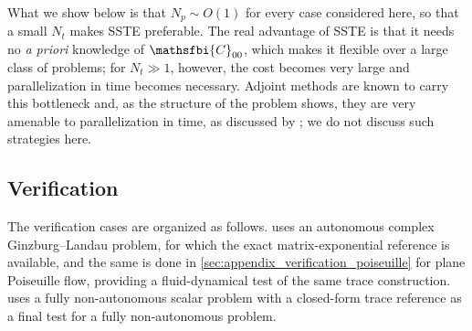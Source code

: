 What we show below is that \(N_p\sim O(1)\) for every case considered here, so that a small
\(N_t\) makes SSTE preferable. The real advantage of SSTE is that it needs no \emph{a priori}
knowledge of \(\mathsfbi{C}_{00}\), which makes it flexible over a large class of problems;
for \(N_t\gg1\), however, the cost becomes very large and parallelization in time becomes
necessary. Adjoint methods are known to carry this bottleneck and, as the structure of the problem
shows, they are very amenable to parallelization in time, as discussed by
\citet{skene-eggl-schmid-2021}; we do not discuss such strategies here.
\subsection{Verification}
\label{sec:appendix_verification}
The verification cases are organized as follows.  uses an autonomous complex Ginzburg--Landau problem, for which the exact matrix-exponential reference is available, and the same is done in \cref{sec:appendix_verification_poiseuille} for plane Poiseuille flow, providing a fluid-dynamical test of the same trace construction.  uses a fully non-autonomous scalar problem with a closed-form trace reference as a final test for a fully non-autonomous problem.

